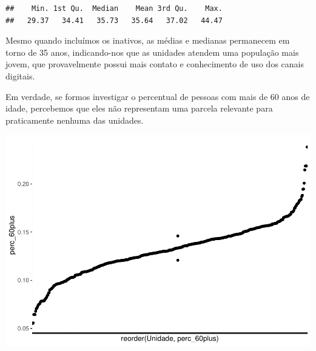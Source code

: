 \documentclass[]{article}
\newenvironment{Shaded}{\begin{snugshade}}{\end{snugshade}}
\newcommand{\DataTypeTok}[1]{\textcolor[rgb]{0.13,0.29,0.53}{#1}}
\newcommand{\DecValTok}[1]{\textcolor[rgb]{0.00,0.00,0.81}{#1}}
\newcommand{\KeywordTok}[1]{\textcolor[rgb]{0.13,0.29,0.53}{\textbf{#1}}}
\newcommand{\NormalTok}[1]{#1}
\newcommand{\OperatorTok}[1]{\textcolor[rgb]{0.81,0.36,0.00}{\textbf{#1}}}
\newcommand{\StringTok}[1]{\textcolor[rgb]{0.31,0.60,0.02}{#1}}
\begin{document}
\begin{verbatim}
##    Min. 1st Qu.  Median    Mean 3rd Qu.    Max. 
##   29.37   34.41   35.73   35.64   37.02   44.47
\end{verbatim}

Mesmo quando incluímos os inativos, as médias e medianas permanecem em
torno de 35 anos, indicando-nos que as unidades atendem uma população
mais jovem, que provavelmente possui mais contato e conhecimento de uso
dos canais digitais.

Em verdade, se formos investigar o percentual de pessoas com mais de 60
anos de idade, percebemos que eles não representam uma parcela relevante
para praticamente nenhuma das unidades.

\begin{Shaded}
\end{Shaded}

\includegraphics{trabalho_de_conclusao_files/figure-latex/unnamed-chunk-15-1.pdf}
\end{document}
